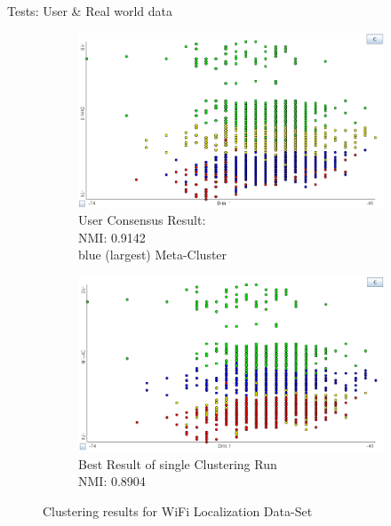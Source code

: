 \documentclass[aspectratio=169]{beamer}
\begin{document}
\begin{frame}{Tests: User \& Real world data}

	\begin{figure}[h]
		\centering
		\begin{subfigure}[t]{.49\textwidth}
			  \centering
			  \includegraphics[width=.99\linewidth]{user_wifi_consensus}
			  \caption{User Consensus Result:\\NMI: 0.9142\\ blue (largest) Meta-Cluster}
			  \label{fig:user_wifi_consensus}
		\end{subfigure}
		\hfill
		\begin{subfigure}[t]{.49\textwidth}
			  \centering
			  \includegraphics[width=.99\linewidth]{user_wifi_best}
			  \caption{Best Result of single Clustering Run\\NMI: 0.8904}
			  \label{fig:user_wifi_best}
		\end{subfigure}
		
		\caption{Clustering results for WiFi Localization Data-Set}
		\label{fig:user_wifi}
	\end{figure}
\end{frame}
\end{document}
